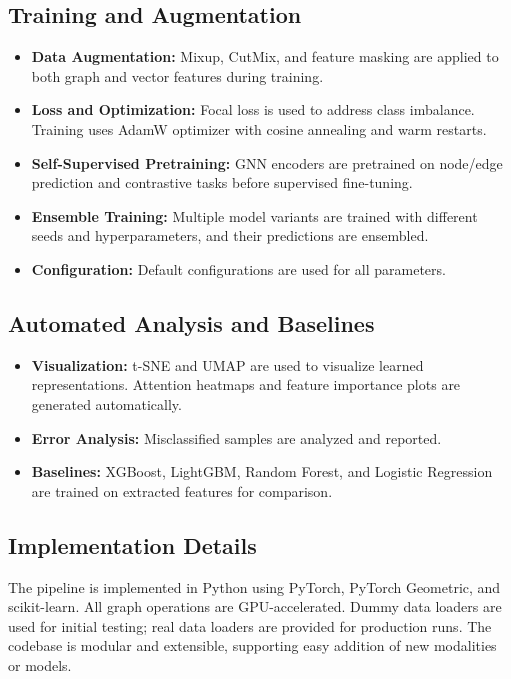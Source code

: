 \documentclass[12pt]{article}
\begin{document}
\subsection{Training and Augmentation}
\begin{itemize}
    \item \textbf{Data Augmentation:} Mixup, CutMix, and feature masking are applied to both graph and vector features during training.
    \item \textbf{Loss and Optimization:} Focal loss is used to address class imbalance. Training uses AdamW optimizer with cosine annealing and warm restarts.
    \item \textbf{Self-Supervised Pretraining:} GNN encoders are pretrained on node/edge prediction and contrastive tasks before supervised fine-tuning.
    \item \textbf{Ensemble Training:} Multiple model variants are trained with different seeds and hyperparameters, and their predictions are ensembled.
    \item \textbf{Configuration:} Default configurations are used for all parameters.
\end{itemize}

\subsection{Automated Analysis and Baselines}
\begin{itemize}
    \item \textbf{Visualization:} t-SNE and UMAP are used to visualize learned representations. Attention heatmaps and feature importance plots are generated automatically.
    \item \textbf{Error Analysis:} Misclassified samples are analyzed and reported.
    \item \textbf{Baselines:} XGBoost, LightGBM, Random Forest, and Logistic Regression are trained on extracted features for comparison.
\end{itemize}

\subsection{Implementation Details}
The pipeline is implemented in Python using PyTorch, PyTorch Geometric, and scikit-learn. All graph operations are GPU-accelerated. Dummy data loaders are used for initial testing; real data loaders are provided for production runs. The codebase is modular and extensible, supporting easy addition of new modalities or models.
\end{document}
